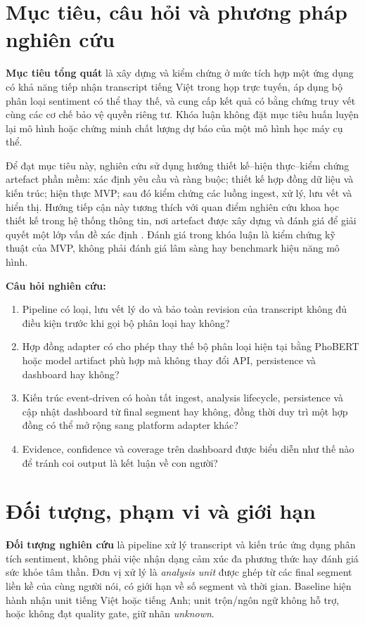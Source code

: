 \section{Mục tiêu, câu hỏi và phương pháp nghiên cứu}
\textbf{Mục tiêu tổng quát} là xây dựng và kiểm chứng ở mức tích hợp một ứng dụng có khả năng tiếp nhận transcript tiếng Việt trong họp trực tuyến, áp dụng bộ phân loại sentiment có thể thay thế, và cung cấp kết quả có bằng chứng truy vết cùng các cơ chế bảo vệ quyền riêng tư. Khóa luận không đặt mục tiêu huấn luyện lại mô hình hoặc chứng minh chất lượng dự báo của một mô hình học máy cụ thể.

Để đạt mục tiêu này, nghiên cứu sử dụng hướng thiết kế--hiện thực--kiểm chứng artefact phần mềm: xác định yêu cầu và ràng buộc; thiết kế hợp đồng dữ liệu và kiến trúc; hiện thực MVP; sau đó kiểm chứng các luồng ingest, xử lý, lưu vết và hiển thị. Hướng tiếp cận này tương thích với quan điểm nghiên cứu khoa học thiết kế trong hệ thống thông tin, nơi artefact được xây dựng và đánh giá để giải quyết một lớp vấn đề xác định \cite{hevner2004}. Đánh giá trong khóa luận là kiểm chứng kỹ thuật của MVP, không phải đánh giá lâm sàng hay benchmark hiệu năng mô hình.

\textbf{Câu hỏi nghiên cứu:}
\begin{enumerate}
  \item Pipeline có loại, lưu vết lý do và bảo toàn revision của transcript không đủ điều kiện trước khi gọi bộ phân loại hay không?
  \item Hợp đồng adapter có cho phép thay thế bộ phân loại hiện tại bằng PhoBERT hoặc model artifact phù hợp mà không thay đổi API, persistence và dashboard hay không?
  \item Kiến trúc event-driven có hoàn tất ingest, analysis lifecycle, persistence và cập nhật dashboard từ final segment hay không, đồng thời duy trì một hợp đồng có thể mở rộng sang platform adapter khác?
  \item Evidence, confidence và coverage trên dashboard được biểu diễn như thế nào để tránh coi output là kết luận về con người?
\end{enumerate}

\section{Đối tượng, phạm vi và giới hạn}
\textbf{Đối tượng nghiên cứu} là pipeline xử lý transcript và kiến trúc ứng dụng phân tích sentiment, không phải việc nhận dạng cảm xúc đa phương thức hay đánh giá sức khỏe tâm thần. Đơn vị xử lý là \emph{analysis unit} được ghép từ các final segment liền kề của cùng người nói, có giới hạn về số segment và thời gian. Baseline hiện hành nhận unit tiếng Việt hoặc tiếng Anh; unit trộn/ngôn ngữ không hỗ trợ, hoặc không đạt quality gate, giữ nhãn \textit{unknown}.

